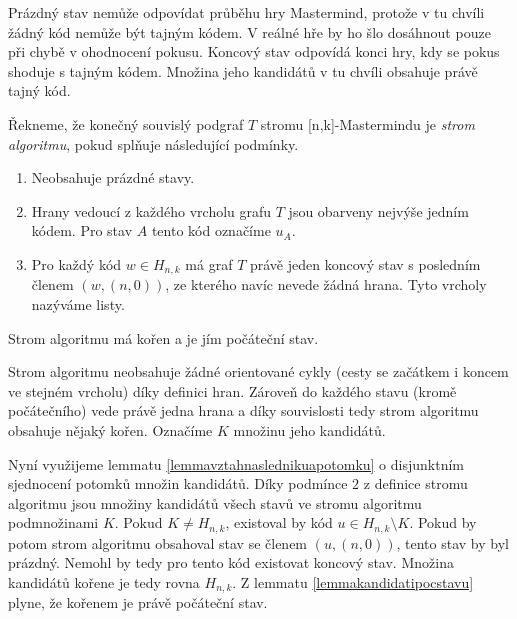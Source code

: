 Prázdný stav nemůže odpovídat průběhu hry Mastermind, protože v tu chvíli žádný kód nemůže být tajným kódem. V reálné hře by ho šlo dosáhnout pouze při chybě v ohodnocení pokusu. Koncový stav odpovídá konci hry, kdy se pokus shoduje s tajným kódem. Množina jeho kandidátů v tu chvíli obsahuje právě tajný kód. 


\begin{definice}
  Řekneme, že konečný souvislý podgraf $T$ stromu [n,k]-Mastermindu je \emph{strom algoritmu}, pokud splňuje následující podmínky.
  \begin{enumerate}
      \item Neobsahuje prázdné stavy.
      \item Hrany vedoucí z každého vrcholu grafu $T$ jsou obarveny nejvýše jedním kódem. Pro stav $A$ tento kód označíme $u_A$.
      \item Pro každý kód $w \in H_{n,k}$ má graf $T$ právě jeden koncový stav s posledním členem $(w, (n,0))$, ze kterého navíc nevede žádná hrana. Tyto vrcholy nazýváme listy.
  \end{enumerate}
\end{definice}

\begin{tvrz}\label{tvrzkorenstromualg}
    Strom algoritmu má kořen a je jím počáteční stav. 
\end{tvrz}
\begin{dukaz}
    Strom algoritmu neobsahuje žádné orientované cykly (cesty se začátkem i koncem ve stejném vrcholu) díky definici hran.
    Zároveň do každého stavu (kromě počátečního) vede právě jedna hrana a díky souvislosti tedy strom algoritmu obsahuje nějaký kořen. Označíme $K$ množinu jeho kandidátů.

    Nyní využijeme lemmatu \ref{lemmavztahnaslednikuapotomku} o disjunktním sjednocení potomků množin kandidátů. Díky podmínce $2$ z definice stromu algoritmu jsou množiny kandidátů všech stavů ve stromu algoritmu podmnožinami $K$. Pokud $K \neq H_{n,k}$, existoval by kód $u \in H_{n,k} \setminus K$. Pokud by potom strom algoritmu obsahoval stav se členem $(u, (n,0))$, tento stav by byl prázdný. Nemohl by tedy pro tento kód existovat koncový stav. Množina kandidátů kořene je tedy rovna $H_{n,k}$. Z lemmatu \ref{lemmakandidatipocstavu} plyne, že kořenem je právě počáteční stav. 
\end{dukaz}


